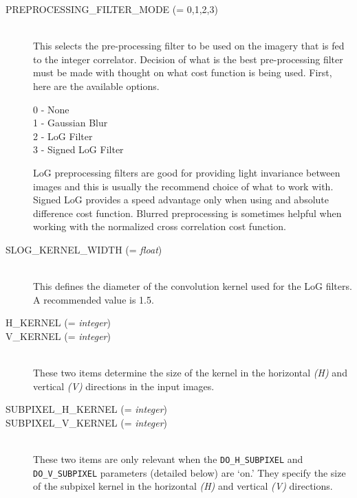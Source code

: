 \begin{description}

\item[PREPROCESSING\_FILTER\_MODE \textnormal{\small{(= 0,1,2,3)}}] \hfill \\

  This selects the pre-processing filter to be used on the imagery
  that is fed to the integer correlator. Decision of what is the best
  pre-processing filter must be made with thought on what cost
  function is being used. First, here are the available options.

  \begin{description}
    \item[0 - None]
    \item[1 - Gaussian Blur]
    \item[2 - LoG Filter]
    \item[3 - Signed LoG Filter]
  \end{description}

  LoG preprocessing filters are good for providing light invariance
  between images and this is usually the recommend choice of what to
  work with. Signed LoG provides a speed advantage only when using and
  absolute difference cost function. Blurred preprocessing is sometimes
  helpful when working with the normalized cross correlation cost
  function.

\item[SLOG\_KERNEL\_WIDTH \textnormal{\small{(= \emph{float})}}] \hfill \\

  This defines the diameter of the convolution kernel used for the LoG
  filters. A recommended value is 1.5.

\item[H\_KERNEL \textnormal{\small{(= \emph{integer})}}]
\item[V\_KERNEL \textnormal{\small{(= \emph{integer})}}] \hfill \\

  These two items determine the size of the kernel in the horizontal
  \emph{(H)} and vertical \emph{(V)} directions in the input images.

\item[SUBPIXEL\_H\_KERNEL \textnormal{\small{(= \emph{integer})}}]
\item[SUBPIXEL\_V\_KERNEL \textnormal{\small{(= \emph{integer})}}] \hfill \\

  These two items are only relevant when the \texttt{DO\_H\_SUBPIXEL}
  and \texttt{DO\_V\_SUBPIXEL} parameters (detailed below) are `on.'
  They specify the size of the subpixel kernel in the horizontal
  \emph{(H)} and vertical \emph{(V)} directions.


\end{description}

